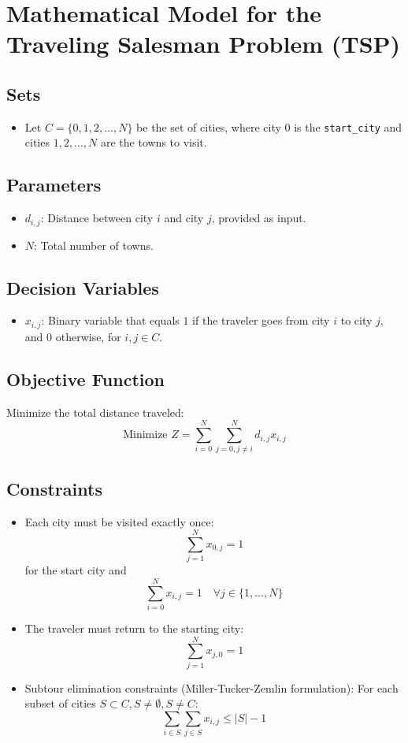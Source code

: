\documentclass{article}
\begin{document}
\section*{Mathematical Model for the Traveling Salesman Problem (TSP)}

\subsection*{Sets}
\begin{itemize}
    \item Let \( C = \{0, 1, 2, \ldots, N\} \) be the set of cities, where city \( 0 \) is the \texttt{start\_city} and cities \( 1, 2, \ldots, N \) are the towns to visit.
\end{itemize}

\subsection*{Parameters}
\begin{itemize}
    \item \( d_{i,j} \): Distance between city \( i \) and city \( j \), provided as input.
    \item \( N \): Total number of towns.
\end{itemize}

\subsection*{Decision Variables}
\begin{itemize}
    \item \( x_{i,j} \): Binary variable that equals \( 1 \) if the traveler goes from city \( i \) to city \( j \), and \( 0 \) otherwise, for \( i, j \in C \).
\end{itemize}

\subsection*{Objective Function}
Minimize the total distance traveled:
\[
\text{Minimize } Z = \sum_{i=0}^{N} \sum_{j=0, j \neq i}^{N} d_{i,j} x_{i,j}
\]

\subsection*{Constraints}
\begin{itemize}
    \item Each city must be visited exactly once:
    \[
    \sum_{j=1}^{N} x_{0,j} = 1
    \]
    for the start city and
    \[
    \sum_{i=0}^{N} x_{i,j} = 1 \quad \forall j \in \{1, \ldots, N\}
    \]
    \item The traveler must return to the starting city:
    \[
    \sum_{j=1}^{N} x_{j,0} = 1
    \]
    \item Subtour elimination constraints (Miller-Tucker-Zemlin formulation):
    For each subset of cities \( S \subset C, S \neq \emptyset, S \neq C \):
    \[
    \sum_{i \in S} \sum_{j \in S} x_{i,j} \leq |S| - 1
    \]
\end{itemize}
\end{document}
